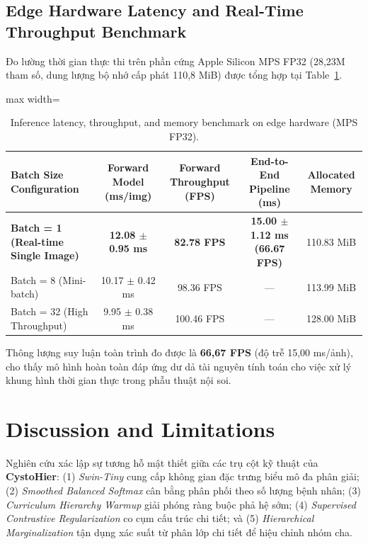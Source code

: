 \documentclass[runningheads]{llncs}
\begin{document}
\subsection{Edge Hardware Latency and Real-Time Throughput Benchmark}
Đo lường thời gian thực thi trên phần cứng Apple Silicon MPS FP32 (28,23M tham số, dung lượng bộ nhớ cấp phát 110,8 MiB) được tổng hợp tại Table~\ref{tab:inference_latency}.

\begin{table}[H]
\centering
\caption{Inference latency, throughput, and memory benchmark on edge hardware (MPS FP32).}
\label{tab:inference_latency}
\begin{adjustbox}{max width=\textwidth}
\begin{tabular}{lcccc}
\toprule
\textbf{Batch Size Configuration} & \textbf{Forward Model (ms/img)} & \textbf{Forward Throughput (FPS)} & \textbf{End-to-End Pipeline (ms)} & \textbf{Allocated Memory} \\
\midrule
\textbf{Batch = 1 (Real-time Single Image)} & \textbf{12.08 $\pm$ 0.95 ms} & \textbf{82.78 FPS} & \textbf{15.00 $\pm$ 1.12 ms (66.67 FPS)} & 110.83 MiB \\
Batch = 8 (Mini-batch) & 10.17 $\pm$ 0.42 ms & 98.36 FPS & --- & 113.99 MiB \\
Batch = 32 (High Throughput) & 9.95 $\pm$ 0.38 ms & 100.46 FPS & --- & 128.00 MiB \\
\bottomrule
\end{tabular}
\end{adjustbox}
\end{table}

Thông lượng suy luận toàn trình đo được là \textbf{66,67 FPS} (độ trễ 15,00 ms/ảnh), cho thấy mô hình hoàn toàn đáp ứng dư dả tài nguyên tính toán cho việc xử lý khung hình thời gian thực trong phẫu thuật nội soi.

\section{Discussion and Limitations}
\label{sec:discussion}

Nghiên cứu xác lập sự tương hỗ mật thiết giữa các trụ cột kỹ thuật của \textbf{CystoHier}: (1) \textit{Swin-Tiny} cung cấp không gian đặc trưng biểu mô đa phân giải; (2) \textit{Smoothed Balanced Softmax} cân bằng phân phối theo số lượng bệnh nhân; (3) \textit{Curriculum Hierarchy Warmup} giải phóng ràng buộc phả hệ sớm; (4) \textit{Supervised Contrastive Regularization} co cụm cấu trúc chi tiết; và (5) \textit{Hierarchical Marginalization} tận dụng xác suất từ phân lớp chi tiết để hiệu chỉnh nhóm cha. 
\end{document}
